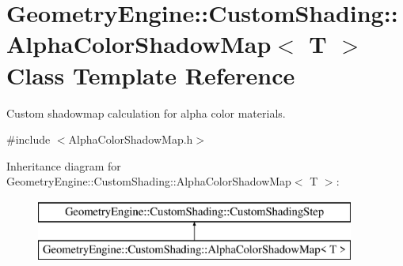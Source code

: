 \hypertarget{class_geometry_engine_1_1_custom_shading_1_1_alpha_color_shadow_map}{}\section{Geometry\+Engine\+::Custom\+Shading\+::Alpha\+Color\+Shadow\+Map$<$ T $>$ Class Template Reference}
\label{class_geometry_engine_1_1_custom_shading_1_1_alpha_color_shadow_map}


Custom shadowmap calculation for alpha color materials.  




{\ttfamily \#include $<$Alpha\+Color\+Shadow\+Map.\+h$>$}

Inheritance diagram for Geometry\+Engine\+::Custom\+Shading\+::Alpha\+Color\+Shadow\+Map$<$ T $>$\+:\begin{figure}[H]
\begin{center}
\leavevmode
\includegraphics[height=2.000000cm]{class_geometry_engine_1_1_custom_shading_1_1_alpha_color_shadow_map}
\end{center}
\end{figure}
